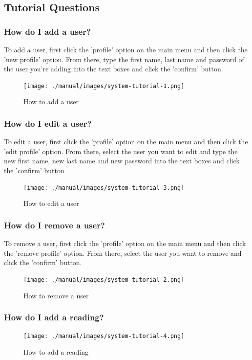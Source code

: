 \subsection{Tutorial Questions}

\subsubsection{How do I add a user?}
To add a user, first click the 'profile' option on the main menu and then click the 'new profile' option. From there, type the first name, last name and password of the user you're adding into the text boxes and click the 'confirm' button.
\begin{figure}[H]
	\texttt{[image: ./manual/images/system-tutorial-1.png]}
	\caption{How to add a user}
\end{figure}

\subsubsection{How do I edit a user?}
To edit a user, first click the 'profile' option on the main menu and then click the 'edit profile' option. From there, select the user you want to edit and type the new first name, new last name and new password into the text boxes and click the 'confirm' button
\begin{figure}[H]
	\texttt{[image: ./manual/images/system-tutorial-3.png]}
	\caption{How to edit a user}
\end{figure}

\subsubsection{How do I remove a user?}
To remove a user, first click the 'profile' option on the main menu and then click the 'remove profile' option. From there, select the user you want to remove and click the 'confirm' button.
\begin{figure}[H]
	\texttt{[image: ./manual/images/system-tutorial-2.png]}
	\caption{How to remove a user}
\end{figure}

\subsubsection{How do I add a reading?}
\begin{figure}[H]
	\texttt{[image: ./manual/images/system-tutorial-4.png]}
	\caption{How to add a reading}
\end{figure}

